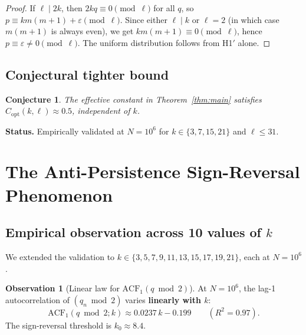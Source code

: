 \documentclass[11pt,a4paper]{article}
\theoremstyle{plain}
\newtheorem{conjecture}[theorem]{Conjecture}
\theoremstyle{definition}
\newtheorem{observation}[theorem]{Observation}
\newcommand{\eps}{\varepsilon}
\begin{document}
\begin{proof}
If $\ell \mid 2k$, then $2kq \equiv 0 \pmod \ell$ for all $q$, so
$p \equiv km(m+1) + \eps \pmod \ell$. Since either $\ell \mid k$ or $\ell = 2$
(in which case $m(m+1)$ is always even), we get $km(m+1) \equiv 0 \pmod\ell$,
hence $p \equiv \eps \neq 0 \pmod \ell$. The uniform distribution follows
from H1$'$ alone.
\end{proof}

\subsection{Conjectural tighter bound}

\begin{openproblem}
\begin{conjecture}\label{conj:tight}
The effective constant in Theorem~\ref{thm:main} satisfies
$C_{\mathrm{opt}}(k, \ell) \approx 0.5$, \emph{independent of $k$}.
\end{conjecture}
\textbf{Status.} Empirically validated at $N = 10^6$ for $k \in \{3, 7, 15, 21\}$
and $\ell \le 31$.
\end{openproblem}

\section{The Anti-Persistence Sign-Reversal Phenomenon}
\label{sec:anti-persistence}

\subsection{Empirical observation across 10 values of $k$}

We extended the validation to $k \in \{3, 5, 7, 9, 11, 13, 15, 17, 19, 21\}$,
each at $N = 10^6$.

\begin{discoverybox}
\begin{observation}[Linear law for $\mathrm{ACF}_1(q \bmod 2)$]\label{disc:acf}
At $N = 10^6$, the lag-1 autocorrelation of $(q_n \bmod 2)$ varies
\textbf{linearly with $k$}:
\[
\mathrm{ACF}_1(q \bmod 2; k) \approx 0.0237\,k - 0.199 \qquad (R^2 = 0.97).
\]
The sign-reversal threshold is $k_0 \approx 8.4$.
\end{observation}
\end{discoverybox}
\end{document}
